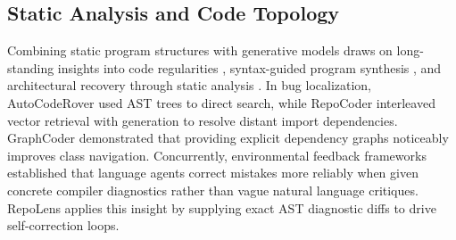 \documentclass[conference]{IEEEtran}
\begin{document}
\subsection{Static Analysis and Code Topology}
Combining static program structures with generative models draws on long-standing insights into code regularities \cite{allamanis2018survey,hellendoorn2017deep}, syntax-guided program synthesis \cite{alur2018syntax}, and architectural recovery through static analysis \cite{salza2023static}. In bug localization, AutoCodeRover \cite{autocoderover2024} used AST trees to direct search, while RepoCoder \cite{repocoder2023} interleaved vector retrieval with generation to resolve distant import dependencies. GraphCoder \cite{graphcoder2025} demonstrated that providing explicit dependency graphs noticeably improves class navigation. Concurrently, environmental feedback frameworks \cite{shinn2023reflexion,yao2023react,dong2024selfcorrection} established that language agents correct mistakes more reliably when given concrete compiler diagnostics rather than vague natural language critiques. RepoLens applies this insight by supplying exact AST diagnostic diffs to drive self-correction loops.
\end{document}

